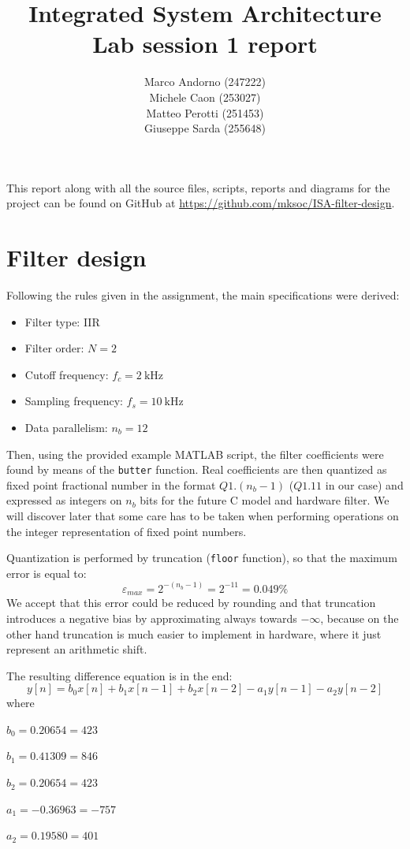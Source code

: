 \documentclass[a4paper]{article}
\title{Integrated System Architecture \\ Lab session 1 report}
\author{Marco Andorno (247222)\\ Michele Caon (253027) \\ Matteo Perotti (251453) \\ Giuseppe Sarda (255648)}
\begin{document}
\maketitle

This report along with all the source files, scripts, reports and diagrams for the project can be found on GitHub at \url{https://github.com/mksoc/ISA-filter-design}.
\tableofcontents

\section{Filter design}
Following the rules given in the assignment, the main specifications were derived:
\begin{itemize}
    \item Filter type: IIR
    \item Filter order: \(N = 2\)
    \item Cutoff frequency: $f_c = \SI{2}{\kilo\hertz}$
    \item Sampling frequency: $f_s = \SI{10}{\kilo\hertz}$
    \item Data parallelism: $n_b = 12$
\end{itemize}
Then, using the provided example MATLAB script, the filter coefficients were found by means of the \texttt{butter} function. Real coefficients are then quantized as fixed point fractional number in the format $Q1.(n_b-1)$ ($Q1.11$ in our case) and expressed as integers on $n_b$ bits for the future C model and hardware filter. We will discover later that some care has to be taken when performing operations on the integer representation of fixed point numbers. 

Quantization is performed by truncation (\texttt{floor} function), so that the maximum error is equal to:
\begin{equation}\label{eq:emax}
    \varepsilon_{max} = 2^{-(n_b-1)} = 2^{-11} = 0.049\%
\end{equation}
We accept that this error could be reduced by rounding and that truncation introduces a negative bias by approximating always towards \(-\infty\), because on the other hand truncation is much easier to implement in hardware, where it just represent an arithmetic shift.

The resulting difference equation is in the end:
\begin{equation}\label{eq:diff}
    y[n] = b_0x[n] + b_1x[n-1] + b_2x[n-2] - a_1y[n-1] - a_2y[n-2]
\end{equation}
where
\begin{description}
    \item \(b_0 = 0.20654 = 423\)
    \item \(b_1 = 0.41309 = 846\)
    \item \(b_2 = 0.20654 = 423\)
    \item \(a_1 = -0.36963 = -757\)
    \item \(a_2 = 0.19580 = 401\)
\end{description}
\end{document}

